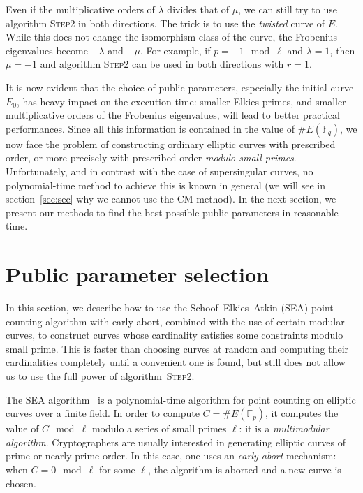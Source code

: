 \documentclass{article}
\newcommand{\F}{\mathbb{F}}
\newcommand{\algstyle}[1]{\textsc{#1}}
\theoremstyle{definition}
\begin{document}
Even if the multiplicative orders of $\lambda$ divides that of $\mu$,
we can still try to use algorithm \algstyle{Step2} in both directions.
The trick is to use the \emph{twisted} curve of $E$. While this does not
change the isomorphism class of the curve, the Frobenius eigenvalues
become $-\lambda$ and $-\mu$. For example, if
$p = -1\mod\ell$ and $\lambda = 1$, then $\mu=-1$ and algorithm
\algstyle{Step2} can be used in both directions with $r=1$.


It is now evident that the choice of public parameters, especially
the initial curve $E_0$, has heavy impact on the execution time:
smaller Elkies primes,
and smaller multiplicative orders of the Frobenius eigenvalues, will
lead to better practical performances. Since all this information
is contained in the value of $\# E(\F_q)$, we now face the problem
of constructing ordinary elliptic curves with prescribed
order, or more precisely with prescribed order \emph{modulo small
primes}. Unfortunately, and in contrast with the case of
supersingular curves, no polynomial-time method to achieve this 
is known in general (we will see in section~\ref{sec:sec} why
we cannot use the CM method).
In the next section, we present our methods to find the best possible
public parameters in reasonable time.

\section{Public parameter selection}
\label{sec:initcurve}


In this section, we describe how to use the Schoof--Elkies--Atkin (SEA) point counting
algorithm with early abort, combined with the use of certain modular curves,
to construct curves whose cardinality satisfies some constraints
modulo small prime.
This is faster than choosing curves at random and computing their cardinalities
completely until a convenient one is found, but still does not allow us
to use the full power of algorithm~\algstyle{Step2}.

The SEA algorithm~\cite{schoof95,todo} is a polynomial-time algorithm for
point counting on elliptic curves over a finite field. In order to compute
$C = \# E(\F_p)$, it computes the value of $C\mod\ell$ modulo a series
of small primes $\ell$: it is a \emph{multimodular algorithm}.
Cryptographers are usually interested in generating elliptic curves of
prime or nearly prime order. In this case, one uses an \emph{early-abort}
mechanism: when $C = 0\mod\ell$ for some $\ell$, the algorithm is aborted
and a new curve is chosen.
\end{document}
